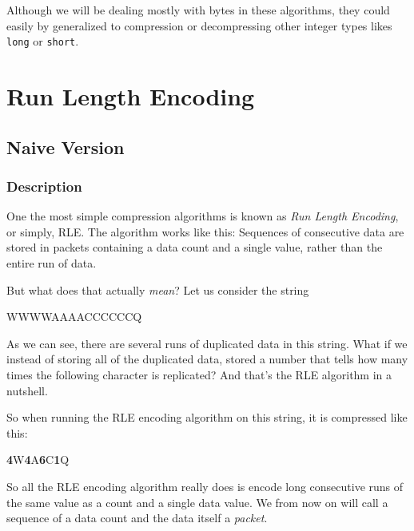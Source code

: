 \begin{refsection}
Although we will be dealing mostly with bytes in these algorithms, they could
easily by generalized to compression or decompressing other integer
types likes \texttt{long} or \texttt{short}.

\section{Run Length Encoding}
\label{sec:rle}

\subsection{Naive Version}
\label{sec:naive-version}

\subsubsection{Description}
\label{sec:description}

One the most simple compression algorithms is known as \textit{Run
  Length Encoding}, or simply,
RLE\cite{nagarajan11:_enhan_approac_run_lengt_encod_schem}.
The algorithm works like this: Sequences of consecutive data are
stored in packets containing a data count and a single value, rather
than the entire run of data.

But what does that actually \textit{mean}? Let us consider the string

\begin{indentpar}
  WWWWAAAACCCCCCQ
\end{indentpar}

As we can see, there are several runs of duplicated data in this
string. What if we instead of storing all of the duplicated data,
stored a number that tells how many times the following character
is replicated? And that's the RLE algorithm in a nutshell.

So when running the RLE encoding algorithm on this string, it is
compressed like this:

\newcommand{\pkt}[2]{\textbf{#1}#2}

\begin{indentpar}
  \pkt{4}{W}\pkt{4}{A}\pkt{6}{C}\pkt{1}{Q}
\end{indentpar}

So all the RLE encoding algorithm really does is encode long
consecutive runs of the same value as a count and a single data
value. We from now on will call a sequence of a data count and the
data itself a \textit{packet}.


\end{refsection}
